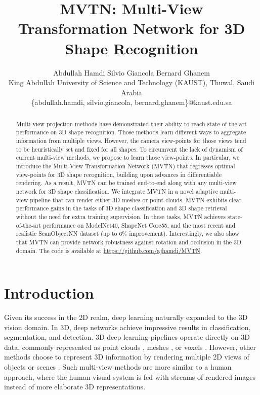 \documentclass[10pt,twocolumn,letterpaper]{article}
\begin{document}
\title{MVTN: Multi-View Transformation Network for 3D Shape Recognition}
\author{Abdullah Hamdi \quad\quad Silvio Giancola \quad\quad Bernard Ghanem\\  
King Abdullah University of Science and Technology (KAUST), Thuwal, Saudi Arabia\\
\small{\{abdullah.hamdi, silvio.giancola, bernard.ghanem\}@kaust.edu.sa}
}


\maketitle
\ificcvfinal\thispagestyle{empty}\fi

\begin{abstract}
Multi-view projection methods have demonstrated their ability to reach state-of-the-art performance on 3D shape recognition. Those methods learn different ways to aggregate information from multiple views. However, the camera view-points for those views tend to be heuristically set and fixed for all shapes. To circumvent the lack of dynamism of current multi-view methods, we propose to learn those view-points. In particular, we introduce the Multi-View Transformation Network (MVTN) that regresses optimal view-points for 3D shape recognition, building upon advances in differentiable rendering. As a result, MVTN can be trained end-to-end along with any multi-view network for 3D shape classification. We integrate MVTN in a novel adaptive multi-view pipeline that can render either 3D meshes or point clouds. MVTN exhibits clear performance gains in the tasks of 3D shape classification and 3D shape retrieval without the need for extra training supervision. In these tasks, MVTN achieves state-of-the-art performance on ModelNet40, ShapeNet Core55, and the most recent and realistic ScanObjectNN dataset (up to 6\% improvement). Interestingly, we also show that MVTN can provide network robustness against rotation and occlusion in the 3D domain. The code is available at \url{https://github.com/ajhamdi/MVTN}.
\end{abstract}
\section{Introduction} \label{sec:introduction}
Given its success in the 2D realm, deep learning naturally expanded to the 3D vision domain. In 3D, deep networks achieve impressive results in classification, segmentation, and detection. 3D deep learning pipelines operate directly on 3D data, commonly represented as point clouds \cite{pointnet,pointnet++,dgcn}, meshes \cite{meshnet,meshcnn}, or voxels \cite{voxnet,minkosky,sparseconv}. However, other methods choose to represent 3D information by rendering multiple 2D views of objects or scenes \cite{mvcnn}. Such multi-view methods are more similar to a human approach, where the human visual system is fed with streams of rendered images instead of more elaborate 3D representations.
\end{document}
